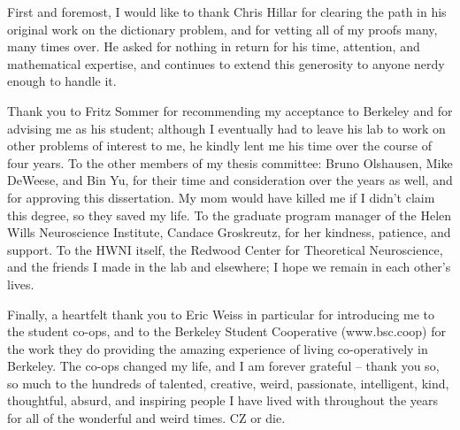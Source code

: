 \documentclass{ucbthesis}
\begin{document}
\begin{frontmatter}
\tableofcontents
\clearpage
\listoffigures
\clearpage

\begin{acknowledgements}
First and foremost, I would like to thank Chris Hillar for clearing the path in his original work on the dictionary problem, and for vetting all of my proofs many, many times over. He asked for nothing in return for his time, attention, and mathematical expertise, and continues to extend this generosity to anyone nerdy enough to handle it. 

Thank you to Fritz Sommer for recommending my acceptance to Berkeley and for advising me as his student; although I eventually had to leave his lab to work on other problems of interest to me, he kindly lent me his time over the course of four years. 
To the other members of my thesis committee: Bruno Olshausen, Mike DeWeese, and Bin Yu, for their time and consideration over the years as well, and for approving this dissertation. My mom would have killed me if I didn't claim this degree, so they saved my life. 
To the graduate program manager of the Helen Wills Neuroscience Institute, Candace Groskreutz, for her kindness, patience, and support. 
To the HWNI itself, the Redwood Center for Theoretical Neuroscience, and the friends I made in the lab and elsewhere; I hope we remain in each other's lives. 

Finally, a heartfelt thank you to Eric Weiss in particular for introducing me to the student co-ops, and to the Berkeley Student Cooperative (www.bsc.coop) for the work they do providing the amazing experience of living co-operatively in Berkeley. The co-ops changed my life, and I am forever grateful -- thank you so, so much to the hundreds of talented, creative, weird, passionate, intelligent, kind, thoughtful, absurd, and inspiring people I have lived with throughout the years for all of the wonderful and weird times. CZ or die. 
\end{acknowledgements}

\end{frontmatter}

\pagestyle{headings}


 
 





% 

\printbibliography
\end{document}
